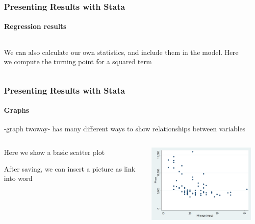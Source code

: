 \documentclass{beamer}
\begin{document}
\begin{frame}
  \frametitle{Presenting Results with Stata}
  \framesubtitle{Regression results}

\begin{columns}[onlytextwidth]
  \begin{column}{5.5cm}
We can also calculate our own statistics, and include them in the model. Here we compute the turning point for a squared term

\normalsize

  \end{column}
  \begin{column}{6cm}



  \end{column}
\end{columns}

\end{frame}



\begin{frame}
  \frametitle{Presenting Results with Stata}
  \framesubtitle{Graphs}
-graph twoway- has many different ways to show relationships between variables
\begin{columns}[onlytextwidth]
  \begin{column}{5.5cm}
Here we show a basic scatter plot
\Tiny

\normalsize
After saving, we can insert a picture as link into word
  \end{column}
  \begin{column}{6cm}
\includegraphics[width=2.5in]{../../word/scatter.PNG}
  \end{column}
\end{columns}

\end{frame}
\end{document}
